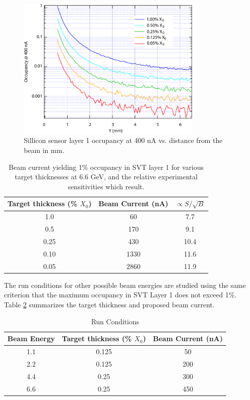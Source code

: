 \begin{figure}[t]
\includegraphics[width=0.8\textwidth]{performance/occupancy.pdf}
\caption{\small{Sillicon sensor layer 1 occupancy at 400 nA vs. distance from the
beam in mm.}}
\label{fig:occup}
\end{figure}

\begin{table}[h]
\begin{center}
\begin{tabular}{|c|c|c|} \hline
  Target thickness (\% $X_0$) & Beam Current (nA) & $\propto S/\sqrt{B}$ \\ \hline
  1.0 & 60 & 7.7 \\ \hline
  0.5 & 170 & 9.1 \\ \hline
  0.25 & 430 & 10.4 \\ \hline
  0.10 & 1330 & 11.6 \\ \hline
  0.05 & 2860 & 11.9 \\ \hline
\end{tabular}
\end{center}
\caption{\small{Beam current yielding 1\% occupancy in SVT layer 1 for various target 
thicknesses at 6.6 GeV, and the relative experimental sensitivities which result.}}
\label{tab:occup}
\end{table}

The run conditions for other possible beam energies are studied using the same criterion that the maximum occupancy 
in SVT Layer 1 does not exceed 1\%. Table \ref{tab:runc} summarizes the target thickness and proposed beam current. 

\begin{table}[h]
\begin{center}
\begin{tabular}{|c|c|c|} \hline
  Beam Energy & Target thickness (\% $X_0$) & Beam Current (nA) \\ \hline
  1.1 & 0.125 & 50 \\ \hline
  2.2 & 0.125 & 200 \\ \hline
  4.4 & 0.25  & 300 \\ \hline
  6.6 & 0.25 & 450 \\ \hline
\end{tabular}
\end{center}
\caption{\small{Run Conditions}}
\label{tab:runc}
\end{table}

